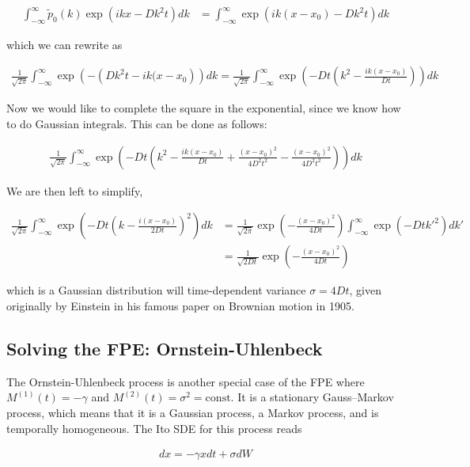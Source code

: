 \documentclass{article}
\begin{document}
\begin{align}
\int_{-\infty}^{\infty} \tilde{p}_{0}(k) \exp\left(ikx-D k^{2}t\right)dk &= \int_{-\infty}^{\infty} \exp\left(ik(x-x_{0})-D k^{2}t\right)dk
\end{align}

which we can rewrite as

\begin{align*}
\frac{1}{\sqrt{2\pi}}\int_{-\infty}^{\infty} \exp\left(-\left(D k^{2}t - ik(x-x_{0}\right)\right)dk
= \frac{1}{\sqrt{2\pi}}\int_{-\infty}^{\infty} \exp\left(-Dt\left(k^{2} - \frac{ik(x-x_{0})}{Dt}\right)\right)dk
\end{align*}

Now we would like to complete the square in the exponential, since we know how to do Gaussian integrals. This can be done as follows:

\begin{align*}
\frac{1}{\sqrt{2\pi}}\int_{-\infty}^{\infty} \exp\left(-Dt\left(k^{2} - \frac{ik(x-x_{0})}{Dt} + \frac{(x-x_{0})^{2}}{4D^{2}t^{2}} - \frac{(x-x_{0})^{2}}{4D^{2}t^{2}}\right)\right)dk
\end{align*}

We are then left to simplify,

\begin{align*}
\frac{1}{\sqrt{2\pi}}\int_{-\infty}^{\infty} \exp\left(-Dt\left(k-\frac{i(x-x_{0})}{2Dt}\right)^{2}\right)dk &= \frac{1}{\sqrt{2\pi}}\exp\left(- \frac{(x-x_{0})^{2}}{4Dt}\right)\int_{-\infty}^{\infty} \exp\left(-Dtk'^{2}\right)dk'\\
&= \frac{1}{\sqrt{2Dt}}\exp\left(- \frac{(x-x_{0})^{2}}{4Dt}\right)
\end{align*}

which is a Gaussian distribution will time-dependent variance $\sigma=4Dt$, given originally by Einstein in his famous paper on Brownian motion in 1905. 

\subsection{Solving the FPE: Ornstein-Uhlenbeck}

The Ornstein-Uhlenbeck process is another special case of the FPE where $M^{(1)}(t) = -\gamma$ and $M^{(2)}(t) = \sigma^{2} = \mathrm{const}$. It is a stationary Gauss–Markov process, which means that it is a Gaussian process, a Markov process, and is temporally homogeneous. The Ito SDE for this process reads

\begin{align}
dx = -\gamma xdt + \sigma dW
\end{align}
\end{document}
